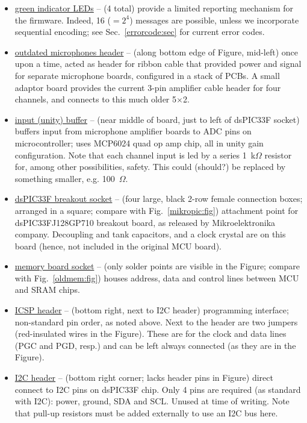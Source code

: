 \documentclass[letterpaper]{article}
\begin{document}
\begin{itemize}
\item \underline{green indicator LEDs} -- (4 total) provide a limited
  reporting mechanism for the firmware. Indeed, 16 ($= 2^4$) messages
  are possible, unless we incorporate sequential encoding; see
  Sec.~\ref{errorcode:sec} for current error codes.

\item \underline{outdated microphones header} -- (along bottom edge of
  Figure, mid-left) once upon a time, acted as header for ribbon cable
  that provided power and signal for separate microphone boards,
  configured in a stack of PCBs. A small adaptor board provides the
  current 3-pin amplifier cable header for four channels, and connects
  to this much older 5$\times$2.

\item \underline{input (unity) buffer} -- (near middle of board, just
  to left of dsPIC33F socket) buffers input from microphone amplifier
  boards to ADC pins on microcontroller; uses MCP6024 quad op amp
  chip, all in unity gain configuration. Note that each channel input
  is led by a series 1~k$\Omega$ resistor for, among other
  possibilities, safety. This could (should?) be replaced by something
  smaller, e.g. 100~$\Omega$.

\item \underline{dsPIC33F breakout socket} -- (four large, black 2-row
  female connection boxes; arranged in a square; compare with
  Fig.~\ref{mikropic:fig}) attachment point for dsPIC33FJ128GP710
  breakout board, as released by Mikroelektronika company. Decoupling
  and tank capacitors, and a clock crystal are on this board (hence,
  not included in the original MCU board).

\item \underline{memory board socket} -- (only solder points are
  visible in the Figure; compare with Fig.~\ref{oldmem:fig}) houses
  address, data and control lines between MCU and SRAM chips.

\item \underline{ICSP header} -- (bottom right, next to I2C header)
  programming interface; non-standard pin order, as noted above. Next
  to the header are two jumpers (red-insulated wires in the
  Figure). These are for the clock and data lines (PGC and PGD, resp.)
  and can be left always connected (as they are in the Figure).

\item \underline{I2C header} -- (bottom right corner; lacks header
  pins in Figure) direct connect to I2C pins on dsPIC33F chip. Only 4
  pins are required (as standard with I2C): power, ground, SDA and
  SCL. Unused at time of writing. Note that pull-up resistors must be
  added externally to use an I2C bus here.
\end{itemize}
\end{document}
